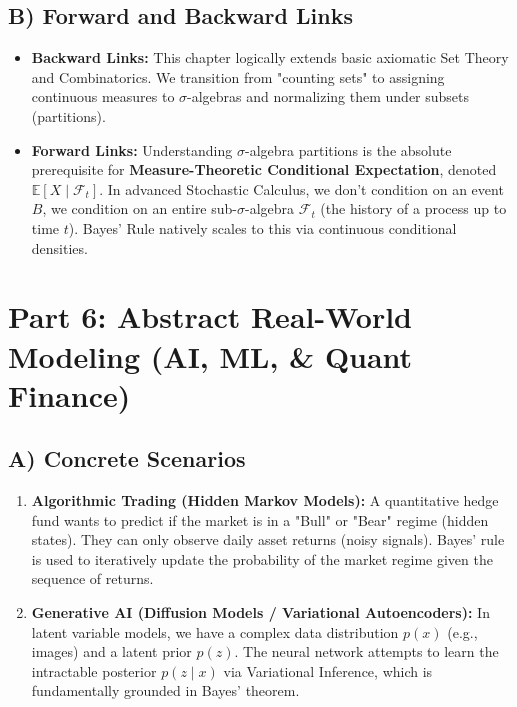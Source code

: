\documentclass[12pt]{article}
\theoremstyle{definition}
\theoremstyle{remark}
\newcommand{\Ebb}{\mathbb{E}}
\newcommand{\Fcal}{\mathcal{F}}
\begin{document}
\subsection{B) Forward and Backward Links}
\begin{itemize}
    \item \textbf{Backward Links:} This chapter logically extends basic axiomatic Set Theory and Combinatorics. We transition from "counting sets" to assigning continuous measures to $\sigma$-algebras and normalizing them under subsets (partitions).
    \item \textbf{Forward Links:} Understanding $\sigma$-algebra partitions is the absolute prerequisite for \textbf{Measure-Theoretic Conditional Expectation}, denoted $\Ebb[X \mid \Fcal_t]$. In advanced Stochastic Calculus, we don't condition on an event $B$, we condition on an entire sub-$\sigma$-algebra $\Fcal_t$ (the history of a process up to time $t$). Bayes' Rule natively scales to this via continuous conditional densities.
\end{itemize}

\section{Part 6: Abstract Real-World Modeling (AI, ML, \& Quant Finance)}

\subsection{A) Concrete Scenarios}
\begin{enumerate}
    \item \textbf{Algorithmic Trading (Hidden Markov Models):} A quantitative hedge fund wants to predict if the market is in a "Bull" or "Bear" regime (hidden states). They can only observe daily asset returns (noisy signals). Bayes' rule is used to iteratively update the probability of the market regime given the sequence of returns.
    \item \textbf{Generative AI (Diffusion Models / Variational Autoencoders):} In latent variable models, we have a complex data distribution $p(x)$ (e.g., images) and a latent prior $p(z)$. The neural network attempts to learn the intractable posterior $p(z \mid x)$ via Variational Inference, which is fundamentally grounded in Bayes' theorem.
\end{enumerate}
\end{document}
